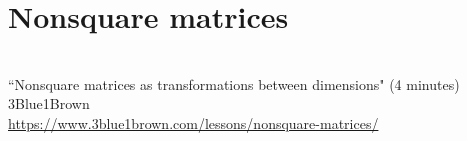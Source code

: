 \section{Nonsquare matrices}
\begin{bookfigure}
   \\
  ``Nonsquare matrices as transformations between dimensions" (4 minutes) \\
  \footnotesize 3Blue1Brown \\
  \url{https://www.3blue1brown.com/lessons/nonsquare-matrices/}
\end{bookfigure}
